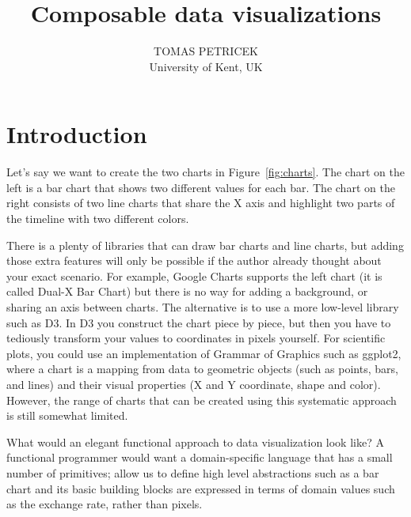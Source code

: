 \documentclass{jfp}
\title{Composable data visualizations}
\author[Tomas Petricek]{TOMAS PETRICEK\\
       University of Kent, UK\\
       \email{t.petricek@kent.ac.uk}}
\begin{document}
\maketitle[f]



\section{Introduction}
Let's say we want to create the two charts in Figure~\ref{fig:charts}. The chart on the left is
a bar chart that shows two different values for each bar. The chart on the right consists of two
line charts that share the X axis and highlight two parts of the timeline with two different colors.

There is a plenty of libraries that can draw bar charts and line charts, but adding those extra
features will only be possible if the author already thought about your exact scenario. For
example, Google Charts supports the left chart (it is called Dual-X Bar Chart) but there is no
way for adding a background, or sharing an axis between charts. The alternative is to use a more
low-level library such as D3. In D3 you construct the chart piece by piece, but then you have to
tediously transform your values to coordinates in pixels yourself. For scientific plots,
you could use an implementation of Grammar of Graphics such as ggplot2, where a chart is
a mapping from data to geometric objects (such as points, bars, and lines) and their visual
properties (X and Y coordinate, shape and color). However, the range of charts that can be
created using this systematic approach is still somewhat limited.

What would an elegant functional approach to data visualization look like? A functional programmer
would want a domain-specific language that has a small number of primitives; allow us to define
high level abstractions such as a bar chart and its basic building blocks are expressed in terms
of domain values such as the exchange rate, rather than pixels.
\end{document}
